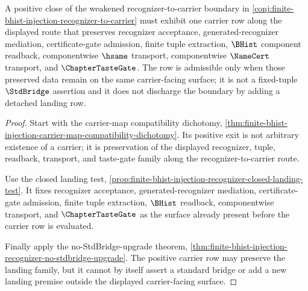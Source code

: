 \begin{theorem}
\label{thm:finite-bhist-injection-carrier-map-positive-boundary}
A positive close of the weakened recognizer-to-carrier boundary in \autoref{conj:finite-bhist-injection-recognizer-to-carrier} must exhibit one carrier row along the displayed route that preserves recognizer acceptance, generated-recognizer mediation, certificate-gate admission, finite tuple extraction, $\BHist$ component readback, componentwise $\hsame$ transport, componentwise $\NameCert$ transport, and $\ChapterTasteGate$. The row is admissible only when those preserved data remain on the same carrier-facing surface; it is not a fixed-tuple $\StdBridge$ assertion and it does not discharge the boundary by adding a detached landing row.
\end{theorem}
\begin{proof}
Start with the carrier-map compatibility dichotomy, \autoref{thm:finite-bhist-injection-carrier-map-compatibility-dichotomy}. Its positive exit is not arbitrary existence of a carrier; it is preservation of the displayed recognizer, tuple, readback, transport, and taste-gate family along the recognizer-to-carrier route.

Use the closed landing test, \autoref{prop:finite-bhist-injection-recognizer-closed-landing-test}. It fixes recognizer acceptance, generated-recognizer mediation, certificate-gate admission, finite tuple extraction, $\BHist$ readback, componentwise transport, and $\ChapterTasteGate$ as the surface already present before the carrier row is evaluated.

Finally apply the no-StdBridge-upgrade theorem, \autoref{thm:finite-bhist-injection-recognizer-no-stdbridge-upgrade}. The positive carrier row may preserve the landing family, but it cannot by itself assert a standard bridge or add a new landing premise outside the displayed carrier-facing surface.
\end{proof}

